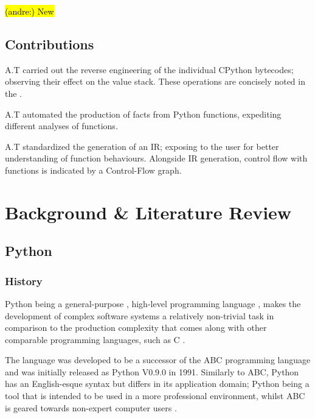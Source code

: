 \documentclass[12pt, a4paper]{report}
\DeclareRobustCommand{\andre}[1]{ {\begingroup\sethlcolor{BurntOrange}\hl{(andre:) #1}\endgroup} }
\theoremstyle{definition}
\theoremstyle{definition}%
\theoremstyle{definition}%
\theoremstyle{definition}%
\theoremstyle{definition}%
\theoremstyle{definition}%
\begin{document}
    \andre{New}
    \section{Contributions}
    \par A.T carried out the reverse engineering of the individual CPython bytecodes; observing their effect on the value stack. These operations are concisely noted
    in the .
    \par A.T automated the production of facts from Python functions, expediting different analyses of functions.
    \par A.T standardized the generation of an IR; exposing to the user for better understanding of function behaviours. Alongside IR generation, control flow with functions
    is indicated by a Control-Flow graph. 


\chapter{Background \& Literature Review}
    \section{Python}
        \subsection{History}
        \par Python being a general-purpose \cite{srinath2017python}, high-level programming language \cite[pp.2--4]{van1995python}, makes the development of complex software systems a relatively non-trivial task
        in comparison to the production complexity that comes along with other comparable programming languages, such as C \cite{summerfield2007rapid}.
        \par The language was developed to be a successor of the ABC programming language \cite{geurts1990abc} and was initially released as Python V0.9.0 in 
        1991. Similarly to ABC, Python has an English-esque syntax but differs in its application domain; Python being a tool that is intended to be used in a more professional environment, whilst
        ABC is geared towards non-expert computer users \cite[pp.285--288]{van1991interactively}. 
        
\end{document}

